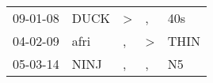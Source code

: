 \begin{supertabular}{lllll}
 09-01-08 &  DUCK &  \textgreater &             , &   40s \\
 04-02-09 &  afri &             , &  \textgreater &  THIN \\
 05-03-14 &  NINJ &             , &             , &    N5 \\
\end{supertabular}
